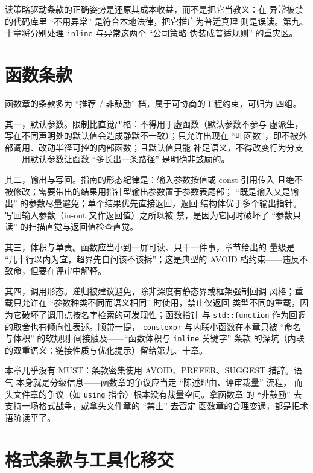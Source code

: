\documentclass[12pt,a4paper,fontset=fandol]{ctexbook}
\newcommand{\Tp}[1]{\texttt{#1}}
\begin{document}
读策略驱动条款的正确姿势是还原其成本收益，而不是把它当教义：在
异常被禁的代码库里 ``不用异常'' 是符合本地法律，把它推广为普适真理
则是误读。第九、十章将分别处理 \Tp{inline} 与异常这两个 ``公司策略
伪装成普适规则'' 的重灾区。

\section{函数条款}
\label{sec:ch02-functions}

函数章的条款多为 ``推荐 / 非鼓励'' 档，属于可协商的工程约束，可归为
四组。

其一，默认参数。限制比直觉严格：不得用于虚函数（默认参数不参与
虚派生，写在不同声明处的默认值会造成静默不一致）；只允许出现在
``叶函数''，即不被外部调用、改动半径可控的内部函数；且默认值只能
补足语义，不得改变行为分支——用默认参数让函数 ``多长出一条路径''
是明确非鼓励的。

其二，输出与写回。指南的形态纪律是：输入参数按值或 const 引用传入
且绝不被修改；需要带出的结果用指针型输出参数置于参数表尾部；
``既是输入又是输出'' 的参数尽量避免；单个结果优先直接返回，返回
结构体优于多个输出指针。写回输入参数（in-out 又作返回值）之所以被
禁，是因为它同时破坏了 ``参数只读'' 的扫描直觉与返回值检查直觉。

其三，体积与单责。函数应当小到一屏可读、只干一件事，章节给出的
量级是 ``几十行以内为宜，超界先自问该不该拆''；这是典型的
AVOID 档约束——违反不致命，但要在评审中解释。

其四，调用形态。递归被建议避免，除非深度有静态界或框架强制回调
风格；重载只允许在 ``参数种类不同而语义相同'' 时使用，禁止仅返回
类型不同的重载，因为它破坏了调用点按名字检索的可发现性；函数指针
与 \Tp{std::function} 作为回调的取舍也有倾向性表述。顺带一提，
\Tp{constexpr} 与内联小函数在本章只被 ``命名与体积'' 的软规则
间接触及——``函数体积与 \Tp{inline} 关键字'' 条款
的深坑（内联的双重语义：链接性质与优化提示）留给第九、十章。

\begin{note}[title={函数条款的语气信号}]
本章几乎没有 MUST：条款密集使用 AVOID、PREFER、SUGGEST 措辞。语气
本身就是分级信息——函数章的争议应当走 ``陈述理由、评审裁量'' 流程，
而头文件章的争议（如 \Tp{using} 指令）根本没有裁量空间。拿函数章
的 ``非鼓励'' 去支持一场格式战争，或拿头文件章的 ``禁止'' 去否定
函数章的合理变通，都是把术语阶读平了。
\end{note}

\section{格式条款与工具化移交}
\label{sec:ch02-format}
\end{document}
